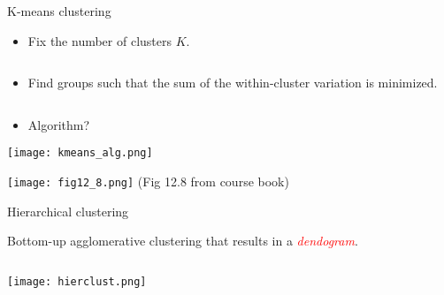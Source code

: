 \documentclass[
  10pt,
  ignorenonframetext,
]{beamer}
\providecommand{\tightlist}{%
  \setlength{\itemsep}{0pt}\setlength{\parskip}{0pt}}
\begin{document}
\begin{frame}
\begin{block}{K-means clustering}
\protect\hypertarget{k-means-clustering}{}
\(~\)

\begin{itemize}
\tightlist
\item
  Fix the number of clusters \(K\).
\end{itemize}

\(~\)

\begin{itemize}
\tightlist
\item
  Find groups such that the sum of the within-cluster variation is
  minimized.
\end{itemize}

\(~\)

\begin{itemize}
\tightlist
\item
  Algorithm?
\end{itemize}
\end{block}
\end{frame}

\begin{frame}
\texttt{[image: kmeans\_alg.png]}
\end{frame}

\begin{frame}
\centering

\texttt{[image: fig12\_8.png]}
\flushleft \small (Fig 12.8 from course book)
\end{frame}

\begin{frame}
\begin{block}{Hierarchical clustering}
\protect\hypertarget{hierarchical-clustering}{}
\(~\)

Bottom-up agglomerative clustering that results in a
\emph{\textcolor{red}{dendogram}}.

\(~\)

\texttt{[image: hierclust.png]}
\end{block}
\end{frame}
\end{document}
